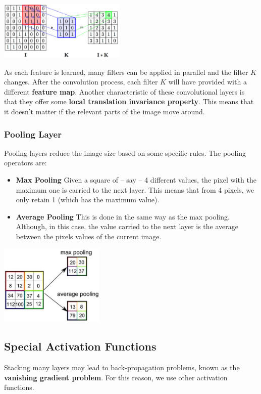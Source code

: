 \documentclass{article}
\begin{document}
\begin{center}
	\includegraphics[width=6cm]{assets/convolutional.png}
\end{center}
As each feature is learned, many filters can be applied in parallel and the filter $K$ changes. After the convolution process, each filter $K$ will have provided with a different \textbf{feature map}. Another characteristic of these convolutional layers is that they offer some \textbf{local translation invariance property}. This means that it doesn't matter if the relevant parts of the image move around.

\subsubsection{Pooling Layer}
Pooling layers reduce the image size based on some specific rules. The pooling operators are:

\begin{itemize}
	\item \textbf{Max Pooling}
	Given a square of -- say -- 4 different values, the pixel with the maximum one is carried to the next layer. This means that from 4 pixels, we only retain 1 (which has the maximum value).
	
	\item \textbf{Average Pooling}
	This is done in the same way as the max pooling. Although, in this case, the value carried to the next layer is the average between the pixels values of the current image.
\end{itemize}

\begin{center}
	\includegraphics[width=5cm]{assets/pooling.png}
\end{center}

\subsection{Special Activation Functions}
Stacking many layers may lead to back-propagation problems, known as the \textbf{vanishing gradient problem}. For this reason, we use other activation functions.
\end{document}
